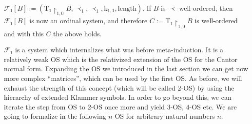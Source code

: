 \documentclass[10pt]{article}
\def\length{\mathrm{length}}
\def\k{\mathrm{k}}
\def\T{\mathrm{T}}
\def\calF{\mathcal{F}}
\begin{document}
$\calF_1[B]:= 
(\T_1 \restriction_{1,0} B,\prec_1,\prec_1,\k_{1,1},\length)$.
If $B$ is $\prec$-well-ordered, then $\calF_1[B]$ is now an ordinal system,
and therefore $C:= \T_1 \restriction_{1,0}B$ is well-ordered and
with this $C$ the above holds.\par 
$\calF_1$ is a system which
internalizes what was before meta-induction. It 
is a relatively weak OS which is the relativized extension of
the OS for the Cantor normal form. Expanding the OS we introduced in the
last section we can get now more complex ``matrices'', which can be
used by the first OS. As before, we will exhaust the strength of this concept
(which will be called $2$-OS) by using the hierarchy of
extended Klammer symbols. In order to go beyond this, we
can iterate the step from OS to $2$-OS once more and yield
$3$-OS, $4$-OS etc. We are going to formalize in the following 
$n$-OS for arbitrary natural numbers $n$.\par 
%
%
%
%
\end{document}
